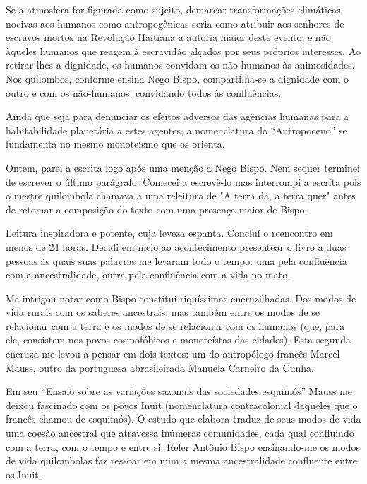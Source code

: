 Se a atmosfera for figurada como sujeito, demarcar  transformações climáticas  nocivas  aos humanos como  antropogênicas seria como atribuir aos senhores de escravos mortos na Revolução Haitiana a autoria maior deste evento, e não àqueles humanos que reagem à  escravidão alçados por  seus próprios interesses.  Ao retirar-lhes a dignidade, os humanos convidam os não-humanos às animosidades. Nos quilombos, conforme ensina Nego Bispo, compartilha-se a  dignidade com o outro e com os não-humanos, convidando todos às confluências.

Ainda que seja para denunciar os efeitos adversos das agências humanas para a habitabilidade planetária a estes agentes, a nomenclatura do \enquote{Antropoceno} se fundamenta no mesmo monoteísmo que os orienta.


Ontem, parei a escrita logo após uma menção a Nego Bispo. Nem sequer terminei de escrever o último parágrafo. Comecei a escrevê-lo  mas  interrompi a escrita pois o mestre quilombola chamava a uma releitura de "A terra dá, a terra quer" antes de retomar a composição do texto com uma presença maior de Bispo.

Leitura inspiradora e potente, cuja leveza espanta. Concluí o reencontro em  menos de 24 horas. Decidi em meio ao acontecimento presentear o livro a duas pessoas às quais suas palavras me levaram todo o tempo: uma pela confluência com a ancestralidade, outra pela confluência com a vida no mato.

Me intrigou notar como Bispo constitui riquíssimas encruzilhadas. Dos modos de vida rurais com os saberes ancestrais; mas também entre os modos de se relacionar com a terra e os modos de se relacionar com os humanos (que, para ele, consistem nos povos cosmofóbicos e monoteístas das cidades). Esta segunda encruza me levou a pensar em dois textos: um do antropólogo francês Marcel Mauss, outro da portuguesa abrasileirada Manuela Carneiro da Cunha.

Em seu \enquote{Ensaio sobre as variações sazonais das sociedades esquimós} Mauss me deixou fascinado com os povos Inuit (nomenclatura contracolonial daqueles que o francês chamou de esquimós). O estudo que elabora traduz de seus modos de vida uma coesão ancestral que atravessa inúmeras comunidades, cada qual confluindo com a terra, com o tempo e entre si. Reler Antônio Bispo ensinando-me os modos de vida quilombolas faz ressoar em mim a mesma ancestralidade confluente entre os Inuit.

